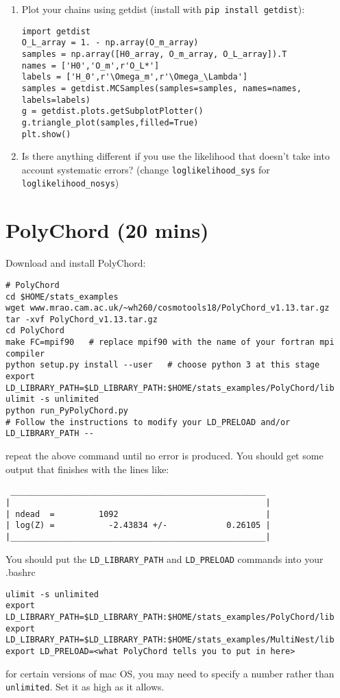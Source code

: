\documentclass{article}
\begin{document}
\begin{enumerate}[resume]
\item Plot your chains using getdist (install with \texttt{pip install getdist}):
\begin{verbatim}
import getdist
O_L_array = 1. - np.array(O_m_array)
samples = np.array([H0_array, O_m_array, O_L_array]).T
names = ['H0','O_m',r'O_L*']
labels = ['H_0',r'\Omega_m',r'\Omega_\Lambda']
samples = getdist.MCSamples(samples=samples, names=names, labels=labels)
g = getdist.plots.getSubplotPlotter()
g.triangle_plot(samples,filled=True)
plt.show()
\end{verbatim}

    \item Is there anything different if you use the likelihood that doesn't take into account systematic errors? (change \texttt{loglikelihood_sys} for \texttt{loglikelihood_nosys})
\end{enumerate}


\section{PolyChord (20 mins)}
Download and install PolyChord:
\begin{verbatim}
# PolyChord
cd $HOME/stats_examples
wget www.mrao.cam.ac.uk/~wh260/cosmotools18/PolyChord_v1.13.tar.gz
tar -xvf PolyChord_v1.13.tar.gz
cd PolyChord
make FC=mpif90   # replace mpif90 with the name of your fortran mpi compiler
python setup.py install --user   # choose python 3 at this stage
export LD_LIBRARY_PATH=$LD_LIBRARY_PATH:$HOME/stats_examples/PolyChord/lib
ulimit -s unlimited
python run_PyPolyChord.py
# Follow the instructions to modify your LD_PRELOAD and/or LD_LIBRARY_PATH --
\end{verbatim}
repeat the above command until no error is produced. You should get some output that finishes with the lines like:
\begin{verbatim}
 ____________________________________________________
|                                                    |
| ndead  =         1092                              |
| log(Z) =           -2.43834 +/-            0.26105 |
|____________________________________________________|
\end{verbatim}

You should put the \texttt{LD_LIBRARY_PATH} and \texttt{LD_PRELOAD} commands into your .bashrc

\begin{verbatim}
ulimit -s unlimited
export LD_LIBRARY_PATH=$LD_LIBRARY_PATH:$HOME/stats_examples/PolyChord/lib
export LD_LIBRARY_PATH=$LD_LIBRARY_PATH:$HOME/stats_examples/MultiNest/lib
export LD_PRELOAD=<what PolyChord tells you to put in here>
\end{verbatim}
for certain versions of mac OS, you may need to specify a number rather than
\texttt{unlimited}. Set it as high as it allows.
\end{document}

